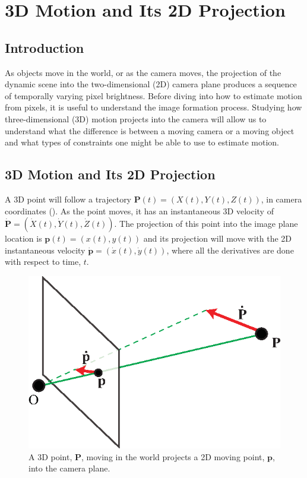 \chapter{3D Motion and Its 2D Projection}
\label{chapter:3D_motion_and_its_2D_projection}



\section{Introduction}

As objects move in the world, or as the camera moves, the projection of the dynamic scene into the two-dimensional (2D) camera plane produces a sequence of temporally varying pixel brightness. Before diving into how to estimate motion from pixels, it is useful to understand the image formation process. Studying how three-dimensional (3D) motion projects into the camera will allow us to understand what the difference is between a moving camera or a moving object and what types of constraints one might be able to use to estimate motion.  


\section{3D Motion and Its 2D Projection}

A 3D point will follow a trajectory $\mathbf{P}(t) = (X(t),Y(t),Z(t))$, in  camera coordinates (\fig{\ref{fig:optical_flow_basic_motion_point}}). As the point moves, it has an instantaneous 3D velocity of $\dot{\mathbf{P}} = (\dot{X}(t), \dot{Y}(t), \dot{Z}(t))$. The projection of this point into the image plane location is $\mathbf{p}(t) = (x(t),y(t))$ and its projection will move with the 2D instantaneous velocity $\dot{\mathbf{p}} = (\dot{x}(t), \dot{y}(t))$, where all the derivatives are done with respect to time, $t$.

\vspace{-.2in}
\begin{figure}[h!]
\centerline{
\includegraphics[width=.5\linewidth]{figures/optical_flow/basic_motion_point.eps}
} 
\caption{A 3D point, $\mathbf{P}$, moving in the world projects a 2D moving point, $\mathbf{p}$, into the camera plane.}
\label{fig:optical_flow_basic_motion_point}
\end{figure}
\vspace{-.2in}


